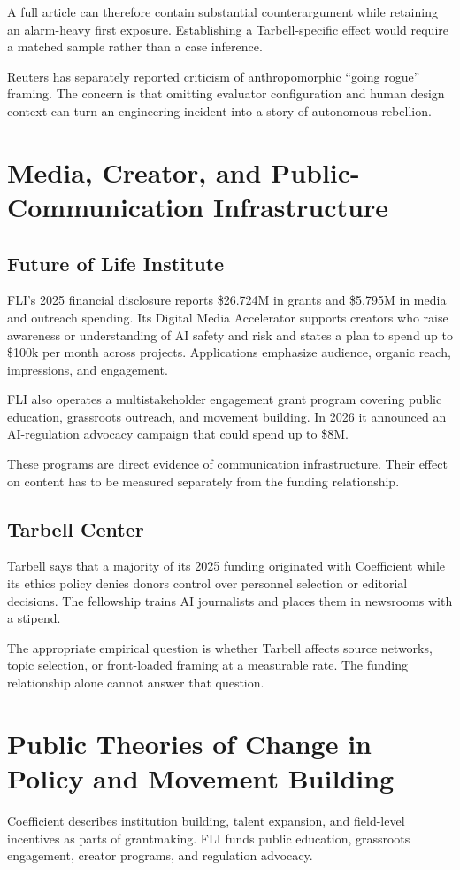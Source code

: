 \documentclass[11pt,twoside]{article}
\begin{document}
A full article can therefore contain substantial counterargument while retaining an alarm-heavy first exposure. Establishing a Tarbell-specific effect would require a matched sample rather than a case inference.

Reuters has separately reported criticism of anthropomorphic ``going rogue'' framing. The concern is that omitting evaluator configuration and human design context can turn an engineering incident into a story of autonomous rebellion.

\section{Media, Creator, and Public-Communication Infrastructure}
\subsection{Future of Life Institute}
FLI's 2025 financial disclosure reports \$26.724M in grants and \$5.795M in media and outreach spending. Its Digital Media Accelerator supports creators who raise awareness or understanding of AI safety and risk and states a plan to spend up to \$100k per month across projects. Applications emphasize audience, organic reach, impressions, and engagement.

FLI also operates a multistakeholder engagement grant program covering public education, grassroots outreach, and movement building. In 2026 it announced an AI-regulation advocacy campaign that could spend up to \$8M.

These programs are direct evidence of communication infrastructure. Their effect on content has to be measured separately from the funding relationship.

\subsection{Tarbell Center}
Tarbell says that a majority of its 2025 funding originated with Coefficient while its ethics policy denies donors control over personnel selection or editorial decisions. The fellowship trains AI journalists and places them in newsrooms with a stipend.

The appropriate empirical question is whether Tarbell affects source networks, topic selection, or front-loaded framing at a measurable rate. The funding relationship alone cannot answer that question.

\section{Public Theories of Change in Policy and Movement Building}
Coefficient describes institution building, talent expansion, and field-level incentives as parts of grantmaking. FLI funds public education, grassroots engagement, creator programs, and regulation advocacy.
\end{document}
